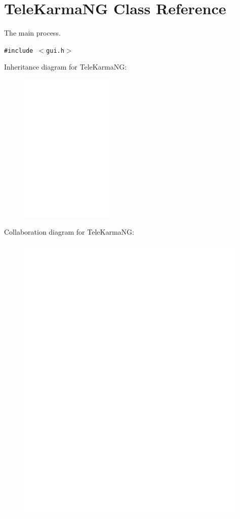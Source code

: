 \hypertarget{classTeleKarmaNG}{
\section{TeleKarmaNG Class Reference}
\label{classTeleKarmaNG}
}
The main process.  


{\tt \#include $<$gui.h$>$}

Inheritance diagram for TeleKarmaNG:\nopagebreak
\begin{figure}[H]
\begin{center}
\leavevmode
\includegraphics[width=126pt]{classTeleKarmaNG__inherit__graph}
\end{center}
\end{figure}
Collaboration diagram for TeleKarmaNG:\nopagebreak
\begin{figure}[H]
\begin{center}
\leavevmode
\includegraphics[height=400pt]{classTeleKarmaNG__coll__graph}
\end{center}
\end{figure}

